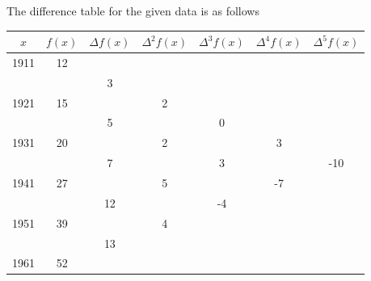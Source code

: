 \documentclass[12pt,class=book,crop=false]{standalone}
\begin{document}
\begin{soln}
    The difference table for the given data is as follows
    \begin{center}
        \begin{tabular}{ccccccc}
            \toprule
            \( x \) & \( f(x) \) & \( \Delta f(x) \) & \( \Delta^2 f(x) \) & \( \Delta^3 f(x) \) & \( \Delta^4 f(x) \) & \( \Delta^5 f(x) \) \\ \midrule
            1911    & 12         &                   &                     &                     &                     &                     \\
                    &            & 3                 &                     &                     &                     &                     \\
            1921    & 15         &                   & 2                   &                     &                     &                     \\
                    &            & 5                 &                     & 0                   &                     &                     \\
            1931    & 20         &                   & 2                   &                     & 3                   &                     \\
                    &            & 7                 &                     & 3                   &                     & -10                 \\
            1941    & 27         &                   & 5                   &                     & -7                  &                     \\
                    &            & 12                &                     & -4                  &                     &                     \\
            1951    & 39         &                   & 4                   &                     &                     &                     \\
                    &            & 13                &                     &                     &                     &                     \\
            1961    & 52         &                   &                     &                     &                     &                     \\ \bottomrule
        \end{tabular}
    \end{center}


\end{soln}
\end{document}
